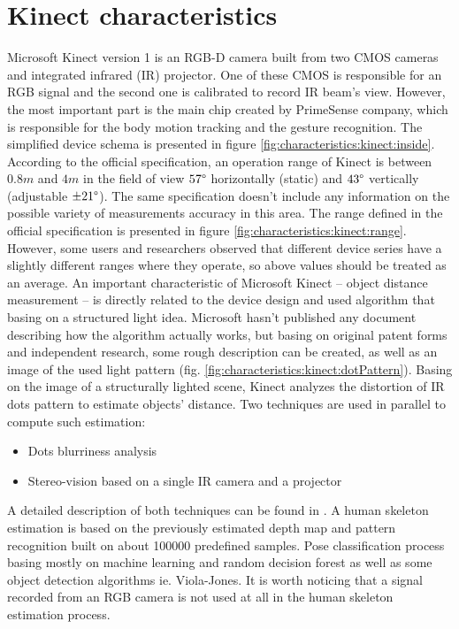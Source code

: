 \documentclass{llncs}
\begin{document}
\section{Kinect characteristics}
Microsoft Kinect version 1 is an RGB-D camera built from two CMOS cameras and integrated infrared (IR) projector. One of these CMOS is responsible for an RGB signal and the second one is calibrated to record IR beam's view. However, the most important part is the main chip created by PrimeSense company, which is responsible for the body motion tracking and the gesture recognition. The simplified device schema is presented in figure \ref{fig:characteristics:kinect:inside}.
According to the official specification, an operation range of Kinect is between  $0.8m$ and $4m$ in the field of view $57\degree$ horizontally (static) and $43\degree$ vertically (adjustable $\pm21\degree$). The same specification doesn't include any information on the possible variety of measurements accuracy in this area. The range defined in the official specification is presented in figure \ref{fig:characteristics:kinect:range}. However, some users \cite{stack:kinect2011} and researchers \cite{DiFilippo2015} observed that different device series have a slightly different ranges where they operate, so above values should be treated as an average.
An important characteristic of Microsoft Kinect -- object distance measurement -- is directly related to the device design and used algorithm that basing on a structured light idea. Microsoft hasn't published any document describing how the algorithm actually works, but basing on original patent forms \cite{patent:20080106746,patent:20100020078,patent:20100118123} and independent research, some rough description can be created, \cite{reichinger2011} as well as an image of the used light pattern (fig. \ref{fig:characteristics:kinect:dotPattern}).
Basing on the image of a structurally lighted scene, Kinect analyzes the distortion of IR dots pattern to estimate objects' distance. Two techniques are used in parallel to compute such estimation:
\begin{itemize}
	\item Dots blurriness analysis
	\item Stereo-vision based on a single IR camera and a projector
\end{itemize}
A detailed description of both techniques can be found in  \cite{Rzeszotarski2006,Fofi2004}.
A human skeleton estimation is based on the previously estimated depth map and pattern recognition built on about 100000 predefined samples. Pose classification process basing mostly on machine learning and random decision forest as well as some object detection algorithms ie. Viola-Jones\cite{Shotton2008,Shotton2011}. It is worth noticing that a signal recorded from an RGB camera is not used at all in the human skeleton estimation process.
\end{document}
